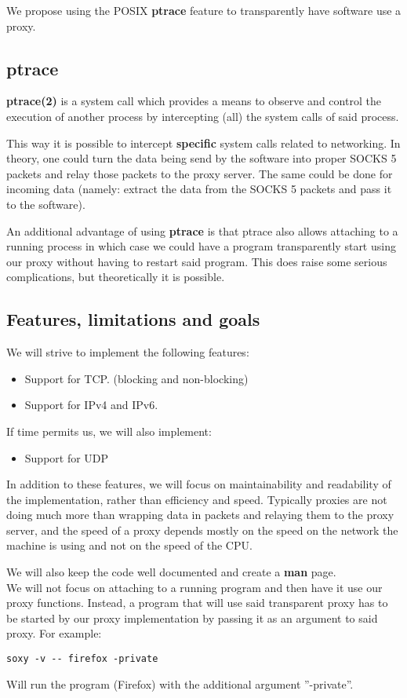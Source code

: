\documentclass[a4paper]{article}
\begin{document}
We propose using the POSIX \textbf{ptrace} feature to transparently have
software use a proxy.

\subsection{ptrace}

\textbf{ptrace(2)} is a system call which provides a means to observe and
control the execution of another process by intercepting (all) the system calls
of said process.

This way it is possible to intercept \textbf{specific} system calls related to
networking. In theory, one could turn the data being send by the software into
proper SOCKS 5 packets and relay those packets to the proxy server. The same
could be done for incoming data (namely: extract the data from the SOCKS 5
packets and pass it to the software).

An additional advantage of using \textbf{ptrace} is that ptrace also allows
attaching to a running process in which case we could have a program
transparently start using our proxy without having to restart said program. This
does raise some serious complications, but theoretically it is possible.

\subsection{Features, limitations and goals}

We will strive to implement the following features:

\begin{itemize}
\item Support for TCP. (blocking and non-blocking)
\item Support for IPv4 and IPv6.
\end{itemize}

If time permits us, we will also implement:

\begin{itemize}
\item Support for UDP
\end{itemize}

In addition to these features, we will focus on maintainability and readability
of the implementation, rather than efficiency and speed. Typically proxies are
not doing much more than wrapping data in packets and relaying them to the proxy
server, and the speed of a proxy depends mostly on the speed on the network the
machine is using and not on the speed of the CPU.

We will also keep the code well documented and create a \textbf{man} page. \\

We will not focus on attaching to a running program and then have it use our
proxy functions. %
Instead, a program that will use said transparent proxy has to be started by our
proxy implementation by passing it as an argument to said proxy. For example:

\begin{verbatim}
soxy -v -- firefox -private
\end{verbatim}

Will run the program (Firefox) with the additional argument ''-private''.
\end{document}
